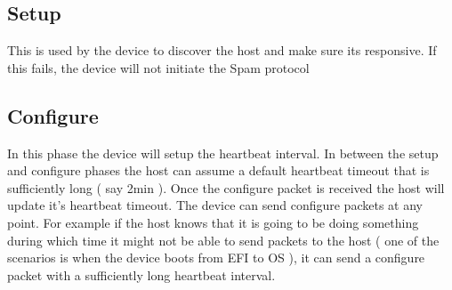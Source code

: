 \begin{figure}[H]
\end{figure}

\subsection{Setup}
This is used by the device to discover the host and make sure its responsive. If this fails, the device will not initiate the Spam protocol

\subsection{Configure}
In this phase the device will setup the heartbeat interval. In between the setup and configure phases the host can assume a default heartbeat timeout that is sufficiently long ( say 2min ). Once the configure packet is received the host will update it's heartbeat timeout. The device can send configure packets at any point. For example if the host knows that it is going to be doing something during which time it might not be able to send packets to the host ( one of the scenarios is when the device boots from EFI to OS ), it can send a configure packet with a sufficiently long heartbeat interval.

